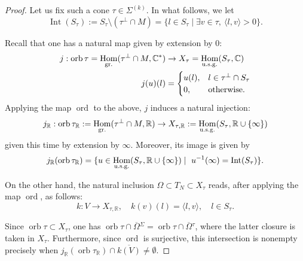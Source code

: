 \documentclass[JEP,XML,SOM,Unicode,NoFloatCountersInSection]{cedram}
\theoremstyle{definition}
\let\ov\overline
\let\sminus\setminus
\newcommand{\CC}{\mathbb{C}}
\newcommand{\RR}{\mathbb{R}}
\DeclareMathOperator{\Hom}{Hom}
\DeclareMathOperator{\Int}{Int}
\DeclareMathOperator{\orb}{orb}
\DeclareMathOperator{\ord}{ord}
\begin{document}
\begin{proof}
Let us fix such a cone $\tau\in\Sigma^{(k)}$. In what follows, we let
\[
\Int (S_\tau):=S_\tau\sminus(\tau^\perp\cap M)=\{l\in S_\tau\mid \exists v\in\tau, \ \langle l,v\rangle >0\}.
\]

Recall that one has a natural map given by extension by $0$:\vspace*{-3pt}
\begin{align*}
j:\orb\tau=\Hom_{\textup{gr.}}(\tau^{\perp}\cap M,\CC^*)&\to X_\tau=\Hom_{\textup{u.s.g.}}(S_\tau,\CC)\\
j(u)(l)&=\begin{cases}
u(l), & l\in\tau^\perp\cap S_\tau\\
0, & \text{otherwise.}
\end{cases}
\end{align*}
Applying the map $\ord$ to the above, $j$ induces a natural injection:\vspace*{-3pt}
\begin{equation*}
j_\RR:\orb\tau_\RR:=\Hom_{\textup{gr.}}(\tau^\perp\cap M,\RR)\to X_{\tau,\RR}:=\Hom_{\textup{u.s.g.}}(S_{\tau},\RR\cup\{\infty\})
\end{equation*}
given this time by extension by $\infty$. Moreover, its image is given by
\begin{equation}\label{imj}
j_\RR(\orb\tau_\RR)=\{u\in\Hom_{\textup{u.s.g.}}(S_{\tau},\RR\cup\{\infty\})\mid \ u^{-1}(\infty)=\Int(S_{\tau})\}.
\end{equation}

On the other hand, the natural inclusion $\Omega\subset T_N\subset X_\tau$ reads, after applying the map $\ord$, as follows:\vspace*{-5pt}
\begin{equation*}
k:V\to X_{\tau,\RR}, \quad k(v)(l)=\langle l,v\rangle, \quad l\in S_{\tau}.
\end{equation*}

Since $\orb\tau\subset X_\tau$, one has $\orb\tau\cap \ov\Omega{}^\Sigma=\orb\tau\cap\ov\Omega{}^\tau$, where the latter closure is taken in $X_\tau$. Furthermore, since $\ord$ is surjective, this intersection is nonempty precisely when $j_\RR(\orb\tau_\RR)\cap \ov{k(V)}\neq \emptyset$.


\end{proof}
\end{document}
